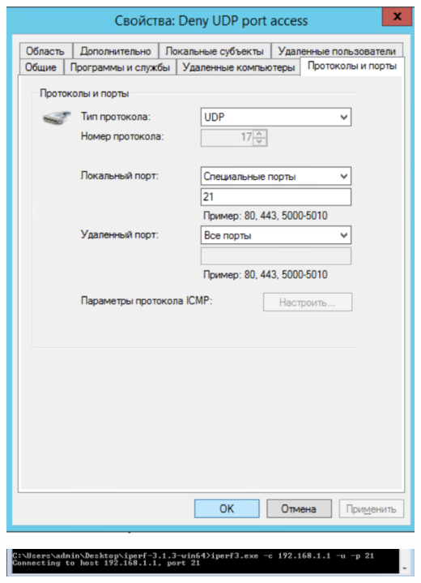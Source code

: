 \documentclass[a4paper,14pt]{extarticle}
\begin{document}
    \begin{center}
        \includegraphics[scale=0.7]{8.4.2.png}
    \end{center}

    \begin{center}
        \includegraphics[scale=0.8]{8.4.3.png}
    \end{center}
\end{document}
